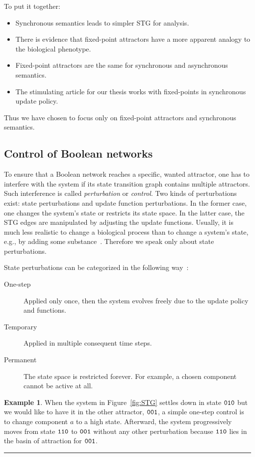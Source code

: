 \documentclass[
	digital, oneside, nosansbold, nocolorbold, nolot, nolof
]{fithesis4}
\theoremstyle{definition}
\theoremstyle{definition}
\newtheorem{example}{Example}
\newenvironment{lexample}
    {\begin{example}}
    {\par\hspace{\stretch{1}}\rule{0.2\textwidth}{0.01ex}\hspace{\stretch{1}}
     \par\end{example}}
\begin{document}
To put it together:
\begin{itemize}
    \item Synchronous semantics leads to simpler STG for analysis.
    \item There is evidence that fixed-point attractors have a more apparent
        analogy to the biological phenotype.
    \item Fixed-point attractors are the same for synchronous and asynchronous
        semantics.
    \item The stimulating article for our thesis works with fixed-points in
        synchronous update policy.
\end{itemize}
Thus we have chosen to focus only on fixed-point attractors and synchronous
semantics.

\subsection{Control of Boolean networks}

To ensure that a Boolean network reaches a specific, wanted attractor, one has
to interfere with the system if its state transition graph contains multiple
attractors. Such interference is called \emph{perturbation} or \emph{control}.
Two kinds of perturbations exist: state perturbations and update function
perturbations. In the former case, one changes the system's state or restricts
its state space. In the latter case, the STG edges are manipulated by adjusting
the update functions. Usually, it is much less realistic to change a biological
process than to change a system's state, e.g., by adding some
substance~\cite{zanudo}. Therefore we speak only about state perturbations.

State perturbations can be categorized in the following
way~\cite{smijakova_thesis}:
\begin{description}
    \item[One-step] Applied only once, then the system evolves freely due to
        the update policy and functions.
    \item[Temporary] Applied in multiple consequent time steps.
    \item[Permanent] The state space is restricted forever. For example, a
        chosen component cannot be active at all.
\end{description}

\begin{lexample}
When the system in Figure~\ref{fig:STG} settles down in state $\mathtt{010}$
but we would like to have it in the other attractor, $\mathtt{001}$, a
simple one-step control is to change component $a$ to a high state.
Afterward, the system progressively moves from state $\mathtt{110}$ to
$\mathtt{001}$ without any other perturbation because $\mathtt{110}$ lies
in the basin of attraction for $\mathtt{001}$.
\end{lexample}
\end{document}
